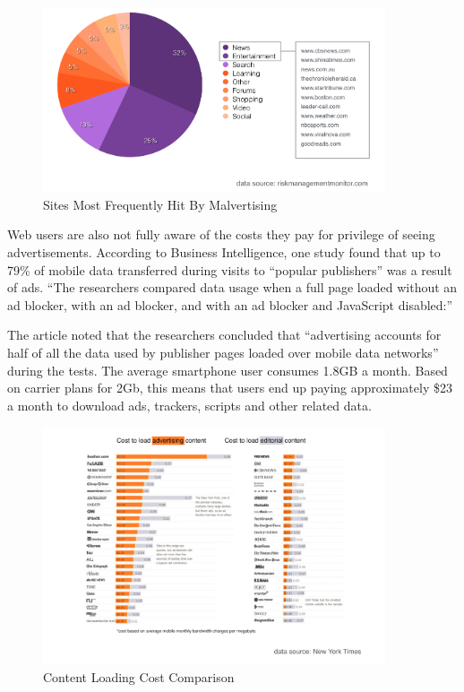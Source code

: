 \documentclass[11pt]{article}
\begin{document}
\begin{figure}
\begin{center}
\includegraphics[width=0.9\textwidth]{hitbymalvertising.png}
\caption{Sites Most Frequently Hit By Malvertising}
\end{center}
\end{figure}


Web users are also not fully aware of the costs they pay for privilege of seeing advertisements. According to Business Intelligence, one study found that up to 79\% of mobile data transferred during visits to “popular publishers” was a result of ads. “The researchers compared data usage when a full page loaded without an ad blocker, with an ad blocker, and with an ad blocker and JavaScript disabled:”


The article noted that the researchers concluded that “advertising accounts for half of all the data used by publisher pages loaded over mobile data networks” during the tests. The average smartphone user consumes 1.8GB a month. Based on carrier plans for 2Gb, this means that users end up paying approximately \$23 a month to download ads, trackers, scripts and other related data.\cite{9}


\begin{figure}
\begin{center}
\includegraphics[width=0.9\textwidth]{cost_to_load_ads.png}
\caption{Content Loading Cost Comparison}
\end{center}
\end{figure}
\end{document}
